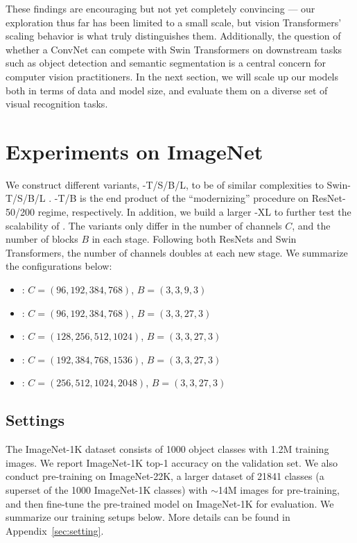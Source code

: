 These findings are encouraging but not yet completely convincing --- our exploration thus far has been limited to a small scale, but vision Transformers' scaling behavior is what truly distinguishes them. Additionally, the question of whether a ConvNet can compete with Swin Transformers on downstream tasks such as object detection and semantic segmentation is a central concern for computer vision practitioners.
In the next section, we will scale up our \cnn{} models both in terms of data and model size, and evaluate them on a diverse set of visual recognition tasks.


\section{Experiments on ImageNet}
\label{sec:convnext_config}
 We construct different \cnn{} variants, \cnn{}-T/S/B/L, to be of similar complexities to Swin-T/S/B/L \cite{Liu2021swin}. \cnn{}-T/B is the end product of the ``modernizing'' procedure on ResNet-50/200 regime, respectively. In addition, we build a larger \cnn{}-XL to further test the scalability of \cnn{}. The variants only differ in the number of channels $C$, and the number of blocks $B$ in each stage. Following both ResNets and Swin Transformers, the number of channels doubles at each new stage. We summarize the configurations below:
\begin{itemize}[leftmargin=-.1ex]
\setlength\itemsep{-.2em}
\item[]\cb{}: $C=(96,192,384,768)$, $B=(3,3,9,3)$
\item[]\cb{}: $C=(96,192,384,768)$, $B=(3,3,27,3)$
\item[]\cb{}: $C=(128,256,512,1024)$, $B=(3,3,27,3)$
\item[]\cb{}: $C=(192,384,768,1536)$, $B=(3,3,27,3)$
\item[]\cb{}: $C=(256,512,1024,2048)$, $B=(3,3,27,3)$
\end{itemize}


\subsection{Settings}
The ImageNet-1K dataset consists of 1000 object classes with 1.2M training images. We report ImageNet-1K top-1 accuracy on the validation set. We also conduct pre-training on ImageNet-22K, a larger dataset of 21841 classes (a superset of the 1000 ImageNet-1K classes) with $\sim$14M images for pre-training, and then fine-tune the pre-trained model on ImageNet-1K for evaluation.  We summarize our training setups below. More details can be found in Appendix~\ref{sec:setting}. 

